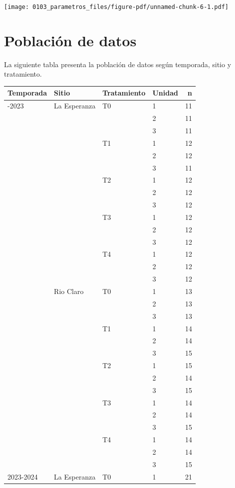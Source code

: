 \documentclass[
  letterpaper,
  DIV=11,
  numbers=noendperiod]{scrreprt}
\begin{document}
\begin{center}
\texttt{[image: 0103\_parametros\_files/figure-pdf/unnamed-chunk-6-1.pdf]}
\end{center}

\chapter{Población de datos}

La siguiente tabla presenta la población de datos según temporada, sitio
y tratamiento.

\begin{longtable}[]{@{}llllr@{}}
\toprule\noalign{}
Temporada & Sitio & Tratamiento & Unidad & n \\
\midrule\noalign{}
\endhead
\bottomrule\noalign{}
\endlastfoot
2022-2023 & La Esperanza & T0 & 1 & 11 \\
& & & 2 & 11 \\
& & & 3 & 11 \\
& & T1 & 1 & 12 \\
& & & 2 & 12 \\
& & & 3 & 11 \\
& & T2 & 1 & 12 \\
& & & 2 & 12 \\
& & & 3 & 12 \\
& & T3 & 1 & 12 \\
& & & 2 & 12 \\
& & & 3 & 12 \\
& & T4 & 1 & 12 \\
& & & 2 & 12 \\
& & & 3 & 12 \\
& Rio Claro & T0 & 1 & 13 \\
& & & 2 & 13 \\
& & & 3 & 13 \\
& & T1 & 1 & 14 \\
& & & 2 & 14 \\
& & & 3 & 15 \\
& & T2 & 1 & 15 \\
& & & 2 & 14 \\
& & & 3 & 15 \\
& & T3 & 1 & 14 \\
& & & 2 & 14 \\
& & & 3 & 15 \\
& & T4 & 1 & 14 \\
& & & 2 & 14 \\
& & & 3 & 15 \\
2023-2024 & La Esperanza & T0 & 1 & 21 \\

\end{longtable}
\end{document}
